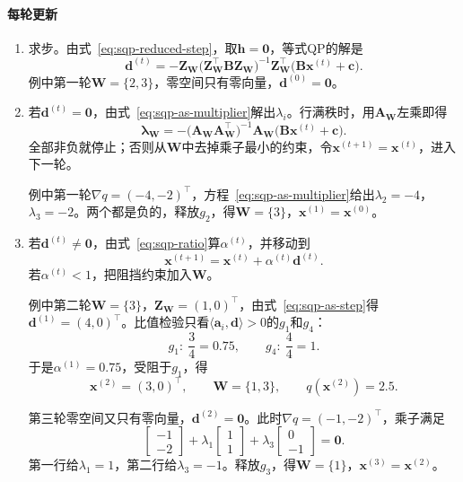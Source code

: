 \paragraph{每轮更新}
\begin{enumerate}
 \item 求步。由式~\eqref{eq:sqp-reduced-step}，取$\bm{h}=\bm{0}$，等式QP的解是
 \begin{equation}
  \bm{d}^{(t)}=-\bm{Z}_{\bm{W}}\bigl(\bm{Z}_{\bm{W}}^\top\bm{B}\bm{Z}_{\bm{W}}\bigr)^{-1}\bm{Z}_{\bm{W}}^\top\bigl(\bm{B}\bm{x}^{(t)}+\bm{c}\bigr).
  \label{eq:sqp-as-step}
 \end{equation}
 例中第一轮$\bm{W}=\{2,3\}$，零空间只有零向量，$\bm{d}^{(0)}=\bm{0}$。

 \item 若$\bm{d}^{(t)}=\bm{0}$，由式~\eqref{eq:sqp-as-multiplier}解出$\lambda_i$。行满秩时，用$\bm{A}_{\bm{W}}$左乘即得
 \begin{equation}
  \bm{\lambda}_{\bm{W}}=-\bigl(\bm{A}_{\bm{W}}\bm{A}_{\bm{W}}^\top\bigr)^{-1}\bm{A}_{\bm{W}}\bigl(\bm{B}\bm{x}^{(t)}+\bm{c}\bigr).
  \label{eq:sqp-as-lambda}
 \end{equation}
 全部非负就停止；否则从$\bm{W}$中去掉乘子最小的约束，令$\bm{x}^{(t+1)}=\bm{x}^{(t)}$，进入下一轮。

 例中第一轮$\nabla q=(-4,-2)^\top$，方程~\eqref{eq:sqp-as-multiplier}给出$\lambda_2=-4$，$\lambda_3=-2$。两个都是负的，释放$g_2$，得$\bm{W}=\{3\}$，$\bm{x}^{(1)}=\bm{x}^{(0)}$。

 \item 若$\bm{d}^{(t)}\neq\bm{0}$，由式~\eqref{eq:sqp-ratio}算$\alpha^{(t)}$，并移动到
 \begin{equation}
  \bm{x}^{(t+1)}=\bm{x}^{(t)}+\alpha^{(t)}\bm{d}^{(t)}.
  \label{eq:sqp-as-move}
 \end{equation}
 若$\alpha^{(t)}<1$，把阻挡约束加入$\bm{W}$。

 例中第二轮$\bm{W}=\{3\}$，$\bm{Z}_{\bm{W}}=(1,0)^\top$，由式~\eqref{eq:sqp-as-step}得$\bm{d}^{(1)}=(4,0)^\top$。比值检验只看$\langle\bm{a}_i,\bm{d}\rangle>0$的$g_1$和$g_4$：
 \[
  g_1:\ \frac{3}{4}=0.75,\qquad g_4:\ \frac{4}{4}=1.
 \]
 于是$\alpha^{(1)}=0.75$，受阻于$g_1$，得
 \[
  \bm{x}^{(2)}=(3,0)^\top,\qquad\bm{W}=\{1,3\},\qquad q(\bm{x}^{(2)})=2.5.
 \]

 第三轮零空间又只有零向量，$\bm{d}^{(2)}=\bm{0}$。此时$\nabla q=(-1,-2)^\top$，乘子满足
 \[
  \begin{bmatrix}-1\\-2\end{bmatrix}+\lambda_1\begin{bmatrix}1\\1\end{bmatrix}+\lambda_3\begin{bmatrix}0\\-1\end{bmatrix}=\bm{0}.
 \]
 第一行给$\lambda_1=1$，第二行给$\lambda_3=-1$。释放$g_3$，得$\bm{W}=\{1\}$，$\bm{x}^{(3)}=\bm{x}^{(2)}$。


\end{enumerate}
